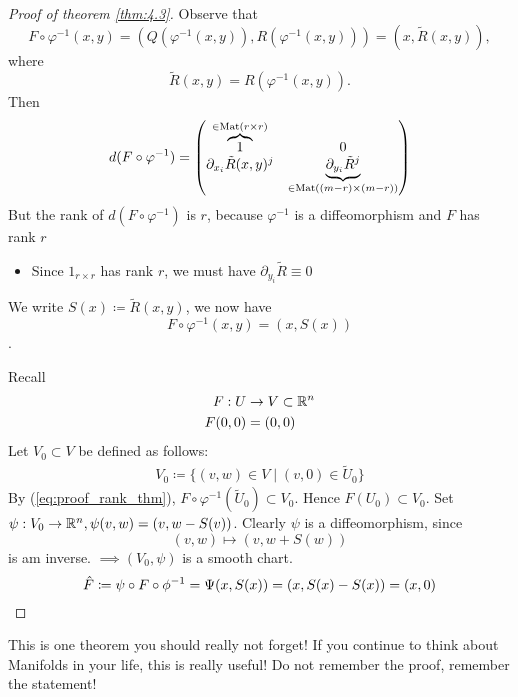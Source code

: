 \begin{proof}[Proof of theorem \ref{thm:4.3}]
     Observe that 
    \[F\circ \varphi^{-1}(x,y)=(Q(\varphi^{-1}(x,y)),R(\varphi^{-1}(x,y)))=(x,\tilde{R}(x,y)),\]
    where \[\tilde{R}(x,y)=R(\varphi^{-1}(x,y)).\]
    Then \begin{align*}
        d(F\circ\varphi^{-1})=\begin{pmatrix}
            \overbrace{1}^{\in {\text{Mat}}(r\times r)} & 0 \\
            \partial_{x_i}\tilde{R}(x,y)^j& \underbrace{\partial_{y_i} \tilde{R}^j}_{\in{\text{Mat}}((m-r)\times (m-r))}
        \end{pmatrix}
    \end{align*}
    But the rank of \(d(F\circ \varphi^{-1})\) is \(r\), because \(\varphi^{-1}\) is a diffeomorphism and \(F\) has rank \(r\)
    \begin{itemize}
        \item Since \(1_{r\times r}\) has rank \(r\), we must have \(\partial_{y_i}\tilde{R}\equiv 0\)
    \end{itemize}
    We write \(S(x)\coloneqq \tilde{R}(x,y)\), we now have \begin{equation}\label{eq:proof_rank_thm}F\circ\varphi^{-1}(x,y)=(x,S(x))\end{equation}.

     Recall
    \begin{align*}
        F:U&\to V\subset\mathbb{R}^n\\
        F(0,0)&=(0,0)
    \end{align*} 
    Let \(V_0\subset V\) be defined as follows:
    \begin{align*}
        V_0\coloneqq \{(v,w)\in V\mid (v,0)\in \tilde{U}_0\}
    \end{align*}
    By (\ref{eq:proof_rank_thm}), \(F\circ \varphi^{-1}(\tilde{U}_0)\subset V_0\). Hence \(F(U_0)\subset V_0\).
    Set \(\psi:V_0\to\mathbb{R}^n,\psi(v,w)=(v,w-S(v))\).
    Clearly \(\psi\) is a diffeomorphism, since\[(v,w)\mapsto (v,w+S(w))\]
    is am inverse. \(\implies (V_0,\psi)\) is a smooth chart. 
    \[\hat{F}\coloneqq \psi\circ F\circ \phi^{-1}=\Psi(x,S(x))=(x,S(x)-S(x))=(x,0)\qedhere\]
\end{proof}

\begin{remark}
    This is one theorem you should really not forget! If you continue to think about Manifolds in your life, this is really useful! %
    Do not remember the proof, remember the statement!
\end{remark}










